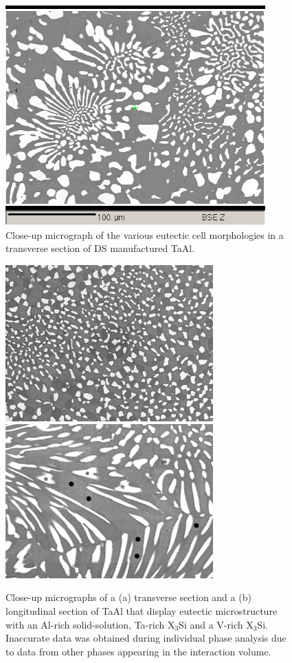 \begin{figure}[htbp]
\begin{center}
\includegraphics[width=10cm]{TaAl_trans_ia}
\caption{Close-up micrograph of the various eutectic cell morphologies in a transverse section of DS manufactured TaAl.}\label{fig:trans_ia}
\end{center}
\end{figure}
%
%
\begin{figure}[htbp]
\begin{center}
\includegraphics[width=8cm]{sanTaAl_RFviii}
\includegraphics[width=8cm]{sanTaAl_RFvi_points}
\caption{Close-up micrographs of a (a) transverse section and a (b) longitudinal section of TaAl that display eutectic microstructure with an Al-rich solid-solution, Ta-rich X$_3$Si and a V-rich X$_3$Si.  Inaccurate data was obtained during individual phase analysis due to data from other phases appearing in the interaction volume.}
\label{fig:viii}
\end{center}
\end{figure}
